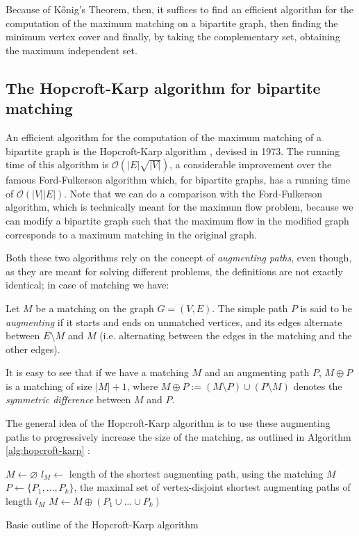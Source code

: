 Because of K\H{o}nig's Theorem, then, it suffices to find an efficient algorithm for the computation of the maximum matching on a bipartite graph, then finding the minimum vertex cover and finally, by taking the complementary set, obtaining the maximum independent set.

\subsection{The Hopcroft-Karp algorithm for bipartite matching}

An efficient algorithm for the computation of the maximum matching of a bipartite graph is the Hopcroft-Karp algorithm \cite{hopcroft_karp}, devised in 1973. The running time of this algorithm is $\mathcal{O}\left( |E|\sqrt{|V|} \right)$, a considerable improvement over the famous Ford-Fulkerson algorithm which, for bipartite graphs, has a running time of $\mathcal{O}\left( |V||E| \right)$. Note that we can do a comparison with the Ford-Fulkerson algorithm, which is technically meant for the maximum flow problem, because we can modify a bipartite graph such that the maximum flow in the modified graph corresponds to a maximum matching in the original graph. 

Both these two algorithms rely on the concept of \emph{augmenting paths}, even though, as they are meant for solving different problems, the definitions are not exactly identical; in case of matching we have:

\begin{definition}
	Let $M$ be a matching on the graph $G=(V,E)$. The simple path $P$ is said to be \emph{augmenting} if it starts and ends on unmatched vertices, and its edges alternate between $E \setminus M$ and $M$ (i.e. alternating between the edges in the matching and the other edges).
\end{definition}

It is easy to see that if we have a matching $M$ and an augmenting path $P$, $M \oplus P$ is a matching of size $|M|+1$, where $M \oplus P := (M \setminus P) \cup (P \setminus M)$ denotes the \emph{symmetric difference} between $M$ and $P$. 

The general idea of the Hopcroft-Karp algorithm is to use these augmenting paths to progressively increase the size of the matching, as outlined in Algorithm \ref{alg:hopcroft-karp} \cite{hopcroft_karp}:

\begin{algorithm}[h]
	\begin{algorithmic}
		\State $M \gets \varnothing$
		\Repeat
		\State $l_M \gets$ length of the shortest augmenting path, using the matching $M$
		\State $P \gets \{ P_1,\dots,P_k \}$, the maximal set of vertex-disjoint shortest augmenting paths of length $l_M$
		\State $M \gets M \oplus (P_1 \cup \dots \cup P_k )$
	\end{algorithmic}
	\caption{Basic outline of the Hopcroft-Karp algorithm} \label{alg:hopcroft-karp}
\end{algorithm}

